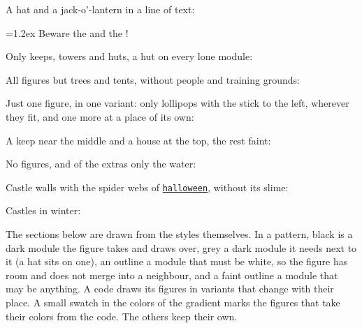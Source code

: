 \documentclass[10pt,DIV=12,parskip=half,english,numbers=noenddot,footnotes=nomultiple,oneside]{scrartcl}
\makeatletter
\let\T\texttt
\newcommand\style[1]{\hyperlink{style:#1}{\T{#1}}\index{#1@\texttt{#1} \idxkind{style}\string|hyperpage}}
\makeatother
\begin{document}
A hat and a jack-o'-lantern in a line of text:
\begin{example}
\FancyQrFigureModule=1.2ex
Beware the  and
the !
\end{example}
Only keeps, towers and huts, a hut on every lone module:
\begin{example}
\end{example}
All figures but trees and tents, without people and training grounds:
\begin{example}
\end{example}
Just one figure, in one variant: only lollipops with the stick to the left, wherever they fit, and one more at a place of its own:
\begin{example}
\end{example}
A keep near the middle and a house at the top, the rest faint:
\begin{example}
\end{example}
No figures, and of the extras only the water:
\begin{example}
\end{example}
Castle walls with the spider webs of \style{halloween}, without its slime:
\begin{example}
\end{example}
Castles in winter:
\begin{example}
\end{example}
The sections below are drawn from the styles themselves.
In a pattern, black is a dark module the figure takes and draws over, grey a dark module it needs next to it (a hat sits on one), an outline a module that must be white, so the figure has room and does not merge into a neighbour, and a faint outline a module that may be anything.
A code draws its figures in variants that change with their place. A small swatch in the colors of the gradient marks the figures that take their colors from the code. The others keep their own.
\clearpage
\end{document}

